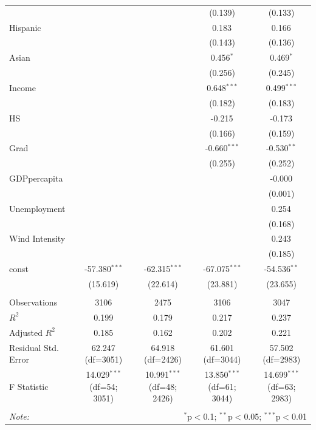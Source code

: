 \begin{table}[!htbp]
\begin{tabular}{@{\extracolsep{5pt}}lcccc}
& & & (0.139) & (0.133) \\
 Hispanic & & & 0.183$^{}$ & 0.166$^{}$ \\
& & & (0.143) & (0.136) \\
 Asian & & & 0.456$^{*}$ & 0.469$^{*}$ \\
& & & (0.256) & (0.245) \\
 Income & & & 0.648$^{***}$ & 0.499$^{***}$ \\
& & & (0.182) & (0.183) \\
 HS & & & -0.215$^{}$ & -0.173$^{}$ \\
& & & (0.166) & (0.159) \\
 Grad & & & -0.660$^{***}$ & -0.530$^{**}$ \\
& & & (0.255) & (0.252) \\
 GDPpercapita & & & & -0.000$^{}$ \\
& & & & (0.001) \\
 Unemployment & & & & 0.254$^{}$ \\
& & & & (0.168) \\
 Wind Intensity & & & & 0.243$^{}$ \\
& & & & (0.185) \\
 const & -57.380$^{***}$ & -62.315$^{***}$ & -67.075$^{***}$ & -54.536$^{**}$ \\
& (15.619) & (22.614) & (23.881) & (23.655) \\
\hline \\[-1.8ex]
 Observations & 3106 & 2475 & 3106 & 3047 \\
 $R^2$ & 0.199 & 0.179 & 0.217 & 0.237 \\
 Adjusted $R^2$ & 0.185 & 0.162 & 0.202 & 0.221 \\
 Residual Std. Error & 62.247 (df=3051) & 64.918 (df=2426) & 61.601 (df=3044) & 57.502 (df=2983) \\
 F Statistic & 14.029$^{***}$ (df=54; 3051) & 10.991$^{***}$ (df=48; 2426) & 13.850$^{***}$ (df=61; 3044) & 14.699$^{***}$ (df=63; 2983) \\
\hline
\hline \\[-1.8ex]
\textit{Note:} & \multicolumn{4}{r}{$^{*}$p$<$0.1; $^{**}$p$<$0.05; $^{***}$p$<$0.01} \\
\end{tabular}
\end{table}